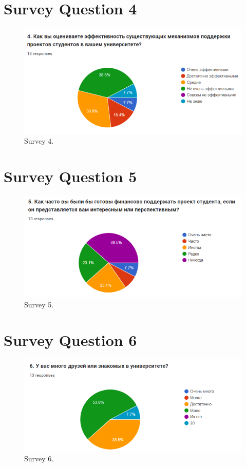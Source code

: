 \section{Survey Question 4}\label{survqa4}
\begin{figure}[H]\label{fig:survey4}
  \centering
  \includegraphics[width=0.8\linewidth]{figures/Survey question 4.png}
  \caption{Survey 4.}
\end{figure}
\section{Survey Question 5}\label{survqa5}
\begin{figure}[H]\label{fig:survey5}
  \centering
  \includegraphics[width=0.8\linewidth]{figures/Survey question 5.png}
  \caption{Survey 5.}
\end{figure}
\section{Survey Question 6}\label{survqa6}
\begin{figure}[H]\label{fig:survey6}
  \centering
  \includegraphics[width=0.8\linewidth]{figures/Survey question 6.png}
  \caption{Survey 6.}
\end{figure}
